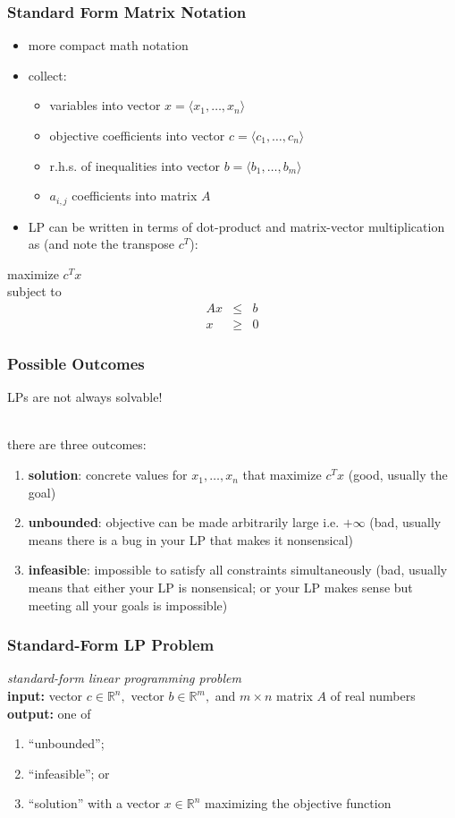 \documentclass{beamer}
\newcommand{\stanza}{ \\~\ }
\begin{document}
\begin{frame} \frametitle{Standard Form Matrix Notation}
\begin{itemize}
  \item more compact math notation
  \item collect:
  \begin{itemize}
    \item variables into vector $x=\langle x_1, \ldots, x_n \rangle$
    \item objective coefficients into vector $c=\langle c_1, \ldots, c_n\rangle$
    \item r.h.s. of inequalities into vector $b=\langle b_1, \ldots, b_m\rangle$
    \item $a_{i,j}$ coefficients into matrix $A$
  \end{itemize}
  \item LP can be written in terms of dot-product and matrix-vector multiplication
    as (and note the transpose $c^T$):
\end{itemize}
\vspace{.5cm}
maximize $c^T x$ \\
subject to
\begin{eqnarray*}
  Ax &\leq& b \\
  x &\geq& 0
\end{eqnarray*}
\end{frame}

\begin{frame} \frametitle{Possible Outcomes}
LPs are not always solvable! \stanza

there are three outcomes:
\begin{enumerate}
  \item \textbf{solution}: concrete values for $x_1, \ldots, x_n$ that maximize
    $c^T x$ (good, usually the goal)
  \item \textbf{unbounded}: objective can be made arbitrarily large i.e.
    $+\infty$ (bad, usually means there is a bug in your LP that makes it nonsensical)
  \item \textbf{infeasible}: impossible to satisfy all constraints simultaneously
  (bad, usually means that either your LP is nonsensical; or your LP makes sense
    but meeting all your goals is impossible)
\end{enumerate}
\end{frame}

\begin{frame} \frametitle{Standard-Form LP Problem}
\emph{standard-form linear programming problem} \\
\textbf{input:} vector $c \in \mathbb{R}^n,$ vector $b \in \mathbb{R}^m,$
  and $m \times n$ matrix $A$ of real numbers \\
\textbf{output:} one of
\begin{enumerate}
  \item ``unbounded'';
  \item ``infeasible''; or
  \item ``solution'' with a vector $x \in \mathbb{R}^n$
    maximizing the objective function
\end{enumerate}

\end{frame}
\end{document}

